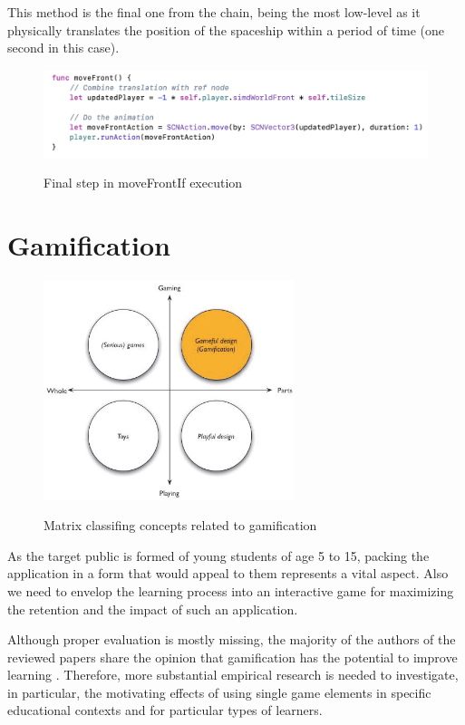 \documentclass[12 pct]{report}
\begin{document}
This method is the final one from the chain, being the most low-level as it physically translates the position of the spaceship within a period of time (one second in this case).
\begin{figure}[H]
\includegraphics[width=1.0\textwidth]{move-front-if-4}
\centering
\label{fig:feature-points}
\caption{ Final step in moveFrontIf execution}
\end{figure}


\section{Gamification}
\begin{figure}[H]
\includegraphics[width=0.65\textwidth]{gamification}
\centering
\label{fig:feature-points}
\caption{ Matrix classifing concepts related to gamification \cite{deterding2011gamification} }
\end{figure}

As the target public is formed of young students of age 5 to 15, packing the application in a form that would appeal to them represents a vital aspect.
Also we need to envelop the learning process into an interactive game for maximizing the retention and the impact of such an application. 

Although proper evaluation is mostly missing, the majority of the authors of the reviewed papers share the opinion that gamification has the potential to improve learning \cite{dicheva2015gamification}. 
Therefore, more substantial empirical research is needed to investigate, in particular, the motivating effects of using single game elements in specific educational contexts and for particular types of learners. 
\end{document}
